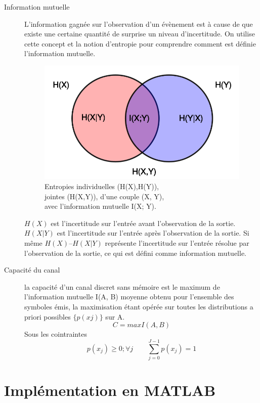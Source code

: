 \documentclass{report}
\begin{document}
\begin{description}
\item[Information mutuelle]
L'information gagnée sur l'observation d'un évènement est à cause de que existe 
une certaine quantité de surprise un niveau d'incertitude. On utilise cette concept
et la notion d'entropie pour comprendre comment est définie l'information mutuelle.\\
\begin{figure}[h]
	\centering
	\captionsetup{justification=centering}
	\includegraphics[width=0.5\linewidth]{info}
	\caption{Entropies individuelles (H(X),H(Y)),\\ jointes (H(X,Y)), d'une couple (X, Y),\\ avec l'information mutuelle I(X; Y).}
	\label{fig:info}
\end{figure}%
$H(X)$ est l’incertitude sur l’entrée avant l’observation de la
sortie. $H(X | Y)$ est l’incertitude sur l’entrée après l’observation de
la sortie. Si même $H(X) – H(X | Y)$ représente l’incertitude sur l’entrée
résolue par l’observation de la sortie, ce qui est défini comme information mutuelle.


\item[Capacité du canal]%
la capacité d’un canal discret sans mémoire
est le maximum de l’information mutuelle I(A, B) moyenne
obtenu pour l’ensemble des symboles émis, la
maximisation étant opérée sur toutes les distributions a
priori possibles $\{p ( x j ) \}$ sur A.
\begin{equation}\label{capaciteCanal}
C = maxI(A,B)
\end{equation}
Sous les cointraintes 
\begin{equation}\label{key}
 p ( x_j ) \geq 0 ; \forall j \qquad \sum_{j=0}^{J-1}p ( x_j )=1
\end{equation}
\end{description} 



\chapter{Implémentation en MATLAB{\small \circledR}}
\end{document}
